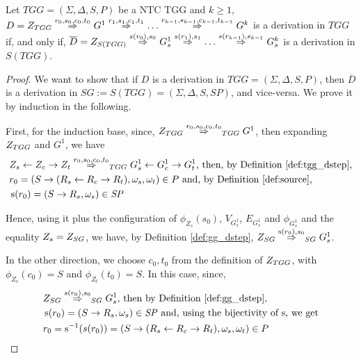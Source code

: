 \documentclass[runningheads]{llncs}
\begin{document}
\begin{theorem}
	\label{thm:one_d_enough}
	Let $\mathit{TGG} = (\Sigma, \Delta, S, P)$ be a NTC TGG and $k \ge 1$, \\
	$D = \startTG{TGG} \tderiv{r_0}{s_0,c_0,t_0}{} G^1 \tderiv{r_1}{s_1,c_1,t_1}{} \dots \tderiv{r_{k-1}}{s_{k-1},c_{k-1},t_{k-1}}{} G^k$ is a derivation in $\mathit{TGG}$ if, and only if, $\overline{D} = \startG{S(TGG)} \deriv{s(r_0)}{s_0}{} G^1_s \deriv{s(r_1)}{s_1}{} \dots \deriv{s(r_{k-1})}{s_{k-1}}{} G^k_s$ is a derivation in $S(\mathit{TGG})$.
\end{theorem}
\begin{proof}
	We want to show that if $D$ is a derivation in $\mathit{TGG} = (\Sigma, \Delta, S, P)$, then $\overline{D}$ is a derivation in $SG := S(\mathit{TGG}) = (\Sigma, \Delta, S, \mathit{SP})$, and vice-versa. We prove it by induction in the following.
	
	First, for the induction base, since, $\startTG{TGG} \tderiv{r_0}{s_0,c_0,t_0}{TGG} G^1$, then expanding $Z_{TGG}$ and $G^1$, we have
	\begin{align*}
		& Z_s \ms{} Z_c \mt{} Z_t \tderiv{r_0}{s_0,c_0,t_0}{TGG} G^1_s \ms{} G^1_c \mt{} G^1_t \text{, then, by Definition \ref{def:tgg_dstep},}\\
		& r_0 = (S \pro (R_s \ms{} R_c \mt{} R_t), \omega_s, \omega_t) \in P \text{ and, by Definition \ref{def:source},}\\
		& \source(r_0) = (S \pro R_s, \omega_s) \in \mathit{SP}
	\end{align*}
	
	Hence, using it plus the configuration of $\phi_{Z_s}(s_0)$, $V_{G^1_s}$, $E_{G^1_s}$ and $\phi_{G^1_s}$ and the equality $Z_s = Z_{SG}$, we have, by Definition \ref{def:gg_dstep}, $\startG{SG} \deriv{\source(r_0)}{s_0}{SG} G^1_s$.
	
	In the other direction, we choose $c_0, t_0$ from the definition of $Z_{TGG}$, with $\phi_{Z_c}(c_0) = S$ and  $\phi_{Z_t}(t_0) = S$. In this case, since,
	\begin{align*}
		& \startG{SG} \deriv{s(r_0)}{s_0}{SG} G^1_s \text{, then by Definition \ref{def:gg_dstep},}\\
		& \source(r_0) = (S \pro R_s, \omega_s) \in \mathit{SP} \text{ and, using the bijectivity of $\source$, we get}\\
		& r_0 = \source^{-1}(s(r_0)) = (S \pro (R_s \ms{} R_c \mt{} R_t), \omega_s, \omega_t) \in P
	\end{align*}
	

\end{proof}
\end{document}
